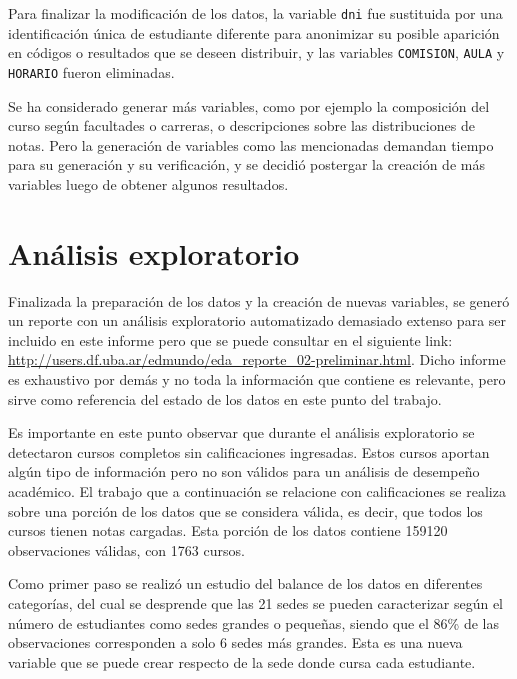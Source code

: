 \documentclass[a4paper,11pt,dvipsnames]{article}
\begin{document}
Para finalizar la modificación de los datos, la variable \texttt{dni} fue sustituida por una identificación única de estudiante diferente para anonimizar su posible aparición en códigos o resultados que se deseen distribuir, y las variables \texttt{COMISION}, \texttt{AULA} y \texttt{HORARIO} fueron eliminadas.\par\medskip

Se ha considerado generar más variables, como por ejemplo la composición del curso según facultades o carreras, o descripciones sobre las distribuciones de notas. Pero la generación de variables como las mencionadas demandan tiempo para su generación y su verificación, y se decidió postergar la creación de más variables luego de obtener algunos resultados.



\section{Análisis exploratorio}

Finalizada la preparación de los datos y la creación de nuevas variables, se generó un reporte con un análisis exploratorio automatizado demasiado extenso para ser incluido en este informe pero que se puede consultar en el siguiente link: \href{http://users.df.uba.ar/edmundo/eda_reporte_02-preliminar.html}{http:\slash\slash users.df.uba.ar\slash edmundo\slash eda\_reporte\_02-preliminar.html}. Dicho informe es exhaustivo por demás y no toda la información que contiene es relevante, pero sirve como referencia del estado de los datos en este punto del trabajo.\par\medskip

Es importante en este punto observar que durante el análisis exploratorio se detectaron cursos completos sin calificaciones ingresadas. Estos cursos aportan algún tipo de información pero no son válidos para un análisis de desempeño académico. El trabajo que a continuación se relacione con calificaciones se realiza sobre una porción de los datos que se considera válida, es decir, que todos los cursos tienen notas cargadas. Esta porción de los datos contiene 159120 observaciones válidas, con 1763 cursos. \par\medskip


Como primer paso se realizó un estudio del balance de los datos en diferentes categorías, del cual se desprende que las 21 sedes se pueden caracterizar según el número de estudiantes como sedes grandes o pequeñas, siendo que el 86\% de las observaciones corresponden a solo 6 sedes más grandes. Esta es una nueva variable que se puede crear respecto de la sede donde cursa cada estudiante.\par\medskip
\end{document}
